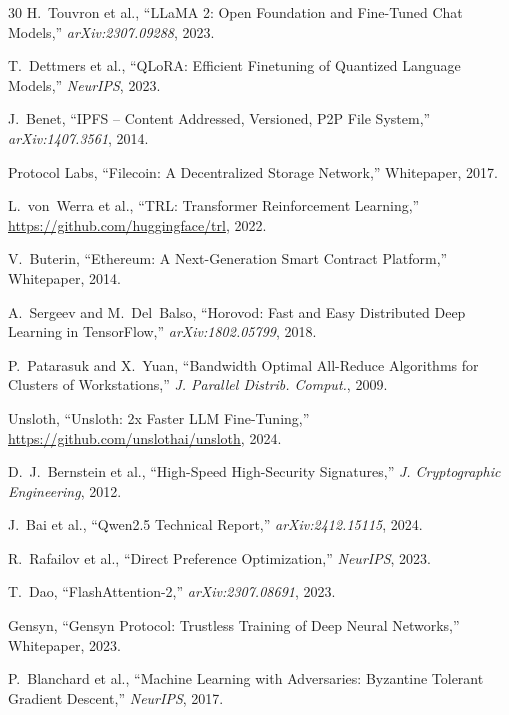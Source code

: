 \documentclass[11pt,letterpaper]{article}
\begin{document}
\begin{thebibliography}{30}
H.~Touvron et al., ``LLaMA 2: Open Foundation and Fine-Tuned Chat Models,'' \textit{arXiv:2307.09288}, 2023.

T.~Dettmers et al., ``QLoRA: Efficient Finetuning of Quantized Language Models,'' \textit{NeurIPS}, 2023.

J.~Benet, ``IPFS -- Content Addressed, Versioned, P2P File System,'' \textit{arXiv:1407.3561}, 2014.

Protocol Labs, ``Filecoin: A Decentralized Storage Network,'' Whitepaper, 2017.

L.~von~Werra et al., ``TRL: Transformer Reinforcement Learning,'' \url{https://github.com/huggingface/trl}, 2022.

V.~Buterin, ``Ethereum: A Next-Generation Smart Contract Platform,'' Whitepaper, 2014.

A.~Sergeev and M.~Del~Balso, ``Horovod: Fast and Easy Distributed Deep Learning in TensorFlow,'' \textit{arXiv:1802.05799}, 2018.

P.~Patarasuk and X.~Yuan, ``Bandwidth Optimal All-Reduce Algorithms for Clusters of Workstations,'' \textit{J. Parallel Distrib. Comput.}, 2009.

Unsloth, ``Unsloth: 2x Faster LLM Fine-Tuning,'' \url{https://github.com/unslothai/unsloth}, 2024.

D.~J.~Bernstein et al., ``High-Speed High-Security Signatures,'' \textit{J. Cryptographic Engineering}, 2012.

J.~Bai et al., ``Qwen2.5 Technical Report,'' \textit{arXiv:2412.15115}, 2024.

R.~Rafailov et al., ``Direct Preference Optimization,'' \textit{NeurIPS}, 2023.

T.~Dao, ``FlashAttention-2,'' \textit{arXiv:2307.08691}, 2023.

Gensyn, ``Gensyn Protocol: Trustless Training of Deep Neural Networks,'' Whitepaper, 2023.

P.~Blanchard et al., ``Machine Learning with Adversaries: Byzantine Tolerant Gradient Descent,'' \textit{NeurIPS}, 2017.

\end{thebibliography}
\end{document}
